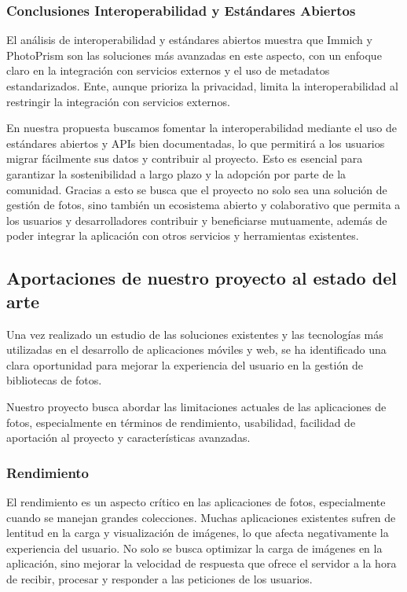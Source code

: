 \subsubsection{Conclusiones Interoperabilidad y Estándares Abiertos}
El análisis de interoperabilidad y estándares abiertos muestra que Immich y PhotoPrism son las soluciones más avanzadas en este aspecto, con un enfoque claro en la integración con servicios externos y el uso de metadatos estandarizados. Ente, aunque prioriza la privacidad, limita la interoperabilidad al restringir la integración con servicios externos.

En nuestra propuesta buscamos fomentar la interoperabilidad mediante el uso de estándares abiertos y APIs bien documentadas, lo que permitirá a los usuarios migrar fácilmente sus datos y contribuir al proyecto. Esto es esencial para garantizar la sostenibilidad a largo plazo y la adopción por parte de la comunidad.
Gracias a esto se busca que el proyecto no solo sea una solución de gestión de fotos, sino también un ecosistema abierto y colaborativo que permita a los usuarios y desarrolladores contribuir y beneficiarse mutuamente, además de poder integrar la aplicación con otros servicios y herramientas existentes.

\subsection{Aportaciones de nuestro proyecto al estado del arte}
Una vez realizado un estudio de las soluciones existentes y las tecnologías más utilizadas en el desarrollo de aplicaciones móviles y web, se ha identificado una clara oportunidad para mejorar la experiencia del usuario en la gestión de bibliotecas de fotos.

Nuestro proyecto busca abordar las limitaciones actuales de las aplicaciones de fotos, especialmente en términos de rendimiento, usabilidad, facilidad de aportación al proyecto y características avanzadas.
\subsubsection{Rendimiento}
El rendimiento es un aspecto crítico en las aplicaciones de fotos, especialmente cuando se manejan grandes colecciones. Muchas aplicaciones existentes sufren de lentitud en la carga y visualización de imágenes, lo que afecta negativamente la experiencia del usuario.
No solo se busca optimizar la carga de imágenes en la aplicación, sino mejorar la velocidad de respuesta que ofrece el servidor a la hora de recibir, procesar y responder a las peticiones de los usuarios.

